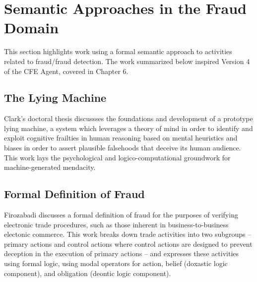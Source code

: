 \section{Semantic Approaches in the Fraud Domain}

This section highlights work using a formal semantic approach to activities related to fraud/fraud detection.  The work summarized below inspired Version 4 of the CFE Agent, covered in Chapter 6.

\subsection{The Lying Machine}

Clark's doctoral thesis \cite{Clark:2010:CIL:2019791} discussses the foundations and development of a prototype lying machine, a system which leverages a theory of mind in order to identify and exploit cognitive frailties in human reasoning based on mental heuristics and biases in order to assert plausible falsehoods that deceive its human audience.  This work lays the psychological and logico-computational groundwork for machine-generated mendacity.

\subsection{Formal Definition of Fraud}

Firozabadi \cite{firozabadi1999formal} discusses a formal definition of fraud for the purposes of verifying electronic trade procedures, such as those inherent in business-to-business electonic commerce.  This work breaks down trade activities into two subgroups -- primary actions and control actions where control actions are designed to prevent deception in the execution of primary actions -- and expresses these activities using formal logic, using modal operators for action, belief (doxastic logic component), and obligation (deontic logic component).










